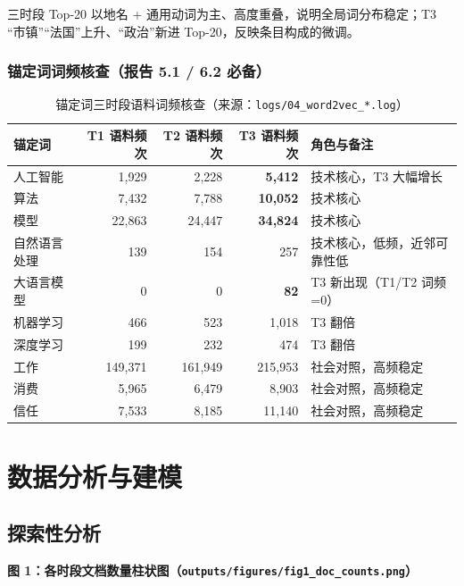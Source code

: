 \documentclass[12pt,a4paper]{article}
\begin{document}
三时段 Top-20 以地名 + 通用动词为主、高度重叠，说明全局词分布稳定；T3 “市镇”“法国”上升、“政治”新进 Top-20，反映条目构成的微调。

\subsubsection*{锚定词词频核查（报告 5.1 / 6.2 必备）}

\begin{table}[H]
\centering
\caption{锚定词三时段语料词频核查（来源：\texttt{logs/04\_word2vec\_*.log}）}
\renewcommand{\arraystretch}{1.25}
\begin{tabular}{|l|r|r|r|l|}
\hline
\textbf{锚定词} & \textbf{T1 语料频次} & \textbf{T2 语料频次} & \textbf{T3 语料频次} & \textbf{角色与备注} \\
\hline
人工智能 & 1,929 & 2,228 & \textbf{5,412} & 技术核心，T3 大幅增长 \\
\hline 算法 & 7,432 & 7,788 & \textbf{10,052} & 技术核心 \\
\hline 模型 & 22,863 & 24,447 & \textbf{34,824} & 技术核心 \\
\hline 自然语言处理 & 139 & 154 & 257 & 技术核心，低频，近邻可靠性低 \\
\hline 大语言模型 & 0 & 0 & \textbf{82} & T3 新出现（T1/T2 词频=0） \\
\hline 机器学习 & 466 & 523 & 1,018 & T3 翻倍 \\
\hline 深度学习 & 199 & 232 & 474 & T3 翻倍 \\
\hline 工作 & 149,371 & 161,949 & 215,953 & 社会对照，高频稳定 \\
\hline 消费 & 5,965 & 6,479 & 8,903 & 社会对照，高频稳定 \\
\hline 信任 & 7,533 & 8,185 & 11,140 & 社会对照，高频稳定 \\
\hline
\end{tabular}
\end{table}

\section{数据分析与建模}

\subsection{探索性分析}

\textbf{图 1：各时段文档数量柱状图（\texttt{outputs/figures/fig1\_doc\_counts.png}）}
\end{document}
